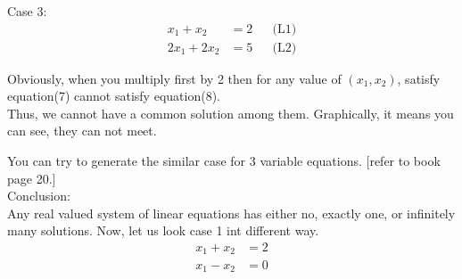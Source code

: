 \documentclass{article}
\begin{document}

Case 3:\\

\begin{align}
    x_1 + x_2 &= 2 &&  \text{(L1)}\\
    2x_1 + 2x_2 &= 5  &&  \text{(L2)}
\end{align}

Obviously, when you multiply first by 2 then for any value of \((x_1, x_2)\), satisfy equation(7) cannot satisfy equation(8).\\

Thus, we cannot have a common solution among them. Graphically, it means you can see, they can not meet.\\


You can try to generate the similar case for 3 variable equations. [refer to book page 20.]\\

Conclusion:\\

Any real valued system of linear equations has either no, exactly one, or infinitely many solutions. Now, let us look case 1 int different way.\\
\begin{align}
    x_1 + x_2 &= 2 \nonumber\\
    x_1 - x_2 &= 0 \nonumber
\end{align}
\end{document}
